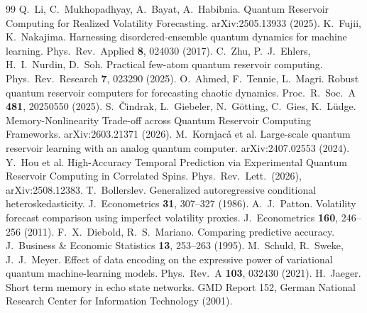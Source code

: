 \documentclass[11pt]{article}
\begin{document}
{\small

\begin{thebibliography}{99}
\itemsep0.5pt
 Q.~Li, C.~Mukhopadhyay, A.~Bayat, A.~Habibnia. Quantum Reservoir Computing for Realized Volatility Forecasting. arXiv:2505.13933 (2025).
 K.~Fujii, K.~Nakajima. Harnessing disordered-ensemble quantum dynamics for machine learning. Phys.\ Rev.\ Applied \textbf{8}, 024030 (2017).
 C.~Zhu, P.~J.~Ehlers, H.~I.~Nurdin, D.~Soh. Practical few-atom quantum reservoir computing. Phys.\ Rev.\ Research \textbf{7}, 023290 (2025).
 O.~Ahmed, F.~Tennie, L.~Magri. Robust quantum reservoir computers for forecasting chaotic dynamics. Proc.\ R.\ Soc.\ A \textbf{481}, 20250550 (2025).
 S.~\v{C}indrak, L.~Giebeler, N.~G\"otting, C.~Gies, K.~L\"udge. Memory-Nonlinearity Trade-off across Quantum Reservoir Computing Frameworks. arXiv:2603.21371 (2026).
 M.~Kornjac\v{a} et al. Large-scale quantum reservoir learning with an analog quantum computer. arXiv:2407.02553 (2024).
 Y.~Hou et al. High-Accuracy Temporal Prediction via Experimental Quantum Reservoir Computing in Correlated Spins. Phys.\ Rev.\ Lett.\ (2026), arXiv:2508.12383.
 T.~Bollerslev. Generalized autoregressive conditional heteroskedasticity. J.\ Econometrics \textbf{31}, 307--327 (1986).
 A.~J.~Patton. Volatility forecast comparison using imperfect volatility proxies. J.\ Econometrics \textbf{160}, 246--256 (2011).
 F.~X.~Diebold, R.~S.~Mariano. Comparing predictive accuracy. J.\ Business \& Economic Statistics \textbf{13}, 253--263 (1995).
 M.~Schuld, R.~Sweke, J.~J.~Meyer. Effect of data encoding on the expressive power of variational quantum machine-learning models. Phys.\ Rev.\ A \textbf{103}, 032430 (2021).
 H.~Jaeger. Short term memory in echo state networks. GMD Report 152, German National Research Center for Information Technology (2001).
\end{thebibliography}
}
\end{document}
